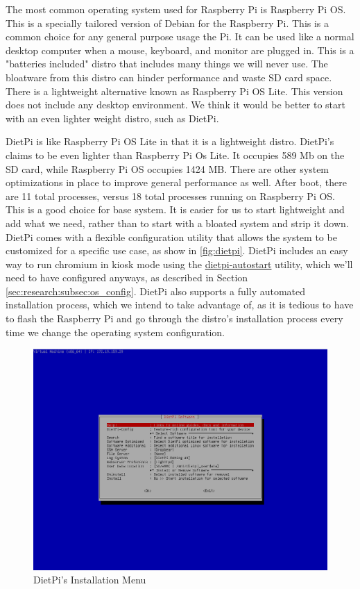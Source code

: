 The most common operating system used for Raspberry Pi is Raspberry Pi OS. This is a
specially tailored version of Debian for the Raspberry Pi. This is a common choice for any
general purpose usage the Pi. It can be used like a normal desktop computer when a mouse,
keyboard, and monitor are plugged in. This is a "batteries included" distro that includes
many things we will never use. The bloatware from this distro can hinder performance and
waste SD card space. There is a lightweight alternative known as Raspberry Pi OS Lite.
This version does not include any desktop environment. We think it would be better to
start with an even lighter weight distro, such as DietPi.

DietPi is like Raspberry Pi OS Lite in that it is a lightweight distro. DietPi's claims to
be even lighter than Raspberry Pi Os Lite. It occupies 589 Mb on the SD card, while
Raspberry Pi OS occupies 1424 MB. There are other system optimizations in place to improve
general performance as well. After boot, there are 11 total processes, versus 18 total
processes running on Raspberry Pi OS. This is a good choice for base system. It is easier
for us to start lightweight and add what we need, rather than to start with a bloated
system and strip it down. DietPi comes with a flexible configuration utility that allows
the system to be customized for a specific use case, as show in \autoref{fig:dietpi}.
DietPi includes an easy way to run chromium in kiosk mode using the \url{dietpi-autostart}
utility, which we'll need to have configured anyways, as described in Section
\ref{sec:research:subsec:os_config}. DietPi also supports a fully automated installation
process, which we intend to take advantage of, as it is tedious to have to flash the
Raspberry Pi and go through the distro's installation process every time we change the
operating system configuration.

\begin{figure}[h!]
  \centering
  \includegraphics[width=\linewidth]{image/dietpi-config.png}
  \caption{DietPi's Installation Menu}
  \label{fig:dietpi}
\end{figure}

